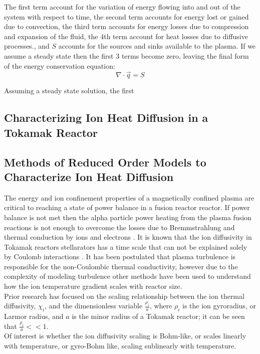 \documentclass{article}
\begin{document}
The first term account for the variation of energy flowing into and out of the system with respect to time, the second term accounts for energy lost or gained due to convection,  the third term accounts for energy losses due to compression and expansion of the fluid, the 4th term account for heat losses due to diffusive processes., and $S$ accounts for the sources and sinks available to the plasma. If we assume a steady state then the first 3 terms become zero, leaving the final form of the energy conservation equation:
$$
 \nabla\cdot \vec{q} = S
$$

Assuming a steady state solution, the first 
\subsection{Characterizing Ion Heat Diffusion in a Tokamak Reactor}
\subsection{Methods of Reduced Order Models to Characterize Ion Heat Diffusion}
The energy and ion confinement properties of a magnetically confined plasma are critical to reaching a state of power balance in a fusion reactor reactor. If power balance is not met then the alpha particle power heating from the plasma fusion reactions is not enough to overcome the losses due to Bremmstrahlung and thermal conduction by ions and electrons \cite{J_Friedberg:1}. It is known that the ion diffusivity in Tokamak reactors stellarators has a time scale that can not be explained solely by Coulomb interactions \cite{Gyro_Petty}.  It has been postulated that plasma turbulence is responsible for the non-Coulombic thermal conductivity, however due to the complexity of modeling turbulence other methods have been used to understand how the ion temperature gradient scales with reactor size.\\

Prior research \cite{Yas_Ido}  has focused on the scaling relationship between the ion thermal diffusivity, $\chi_i$, and the dimensionless variable  $\frac{\rho_i}{a}$,  where $\rho_i$ is the ion gyroradius, or Larmor radius, and $a$ is the minor radius of a Tokamak reactor;  it can be seen that  $\frac{\rho_i}{a}<<1$.\\

Of interest is whether the ion diffusivity scaling is Bohm-like, or scales linearly with temperature, or gyro-Bohm like, scaling sublinearly with temperature.\\
\end{document}
